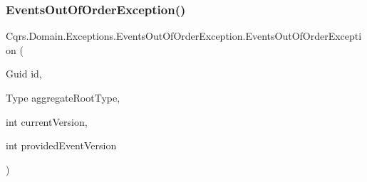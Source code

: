 \subsubsection{\texorpdfstring{Events\+Out\+Of\+Order\+Exception()}{EventsOutOfOrderException()}}
{\footnotesize\ttfamily Cqrs.\+Domain.\+Exceptions.\+Events\+Out\+Of\+Order\+Exception.\+Events\+Out\+Of\+Order\+Exception (\begin{DoxyParamCaption}\item[{Guid}]{id,  }\item[{Type}]{aggregate\+Root\+Type,  }\item[{int}]{current\+Version,  }\item[{int}]{provided\+Event\+Version }\end{DoxyParamCaption})}

